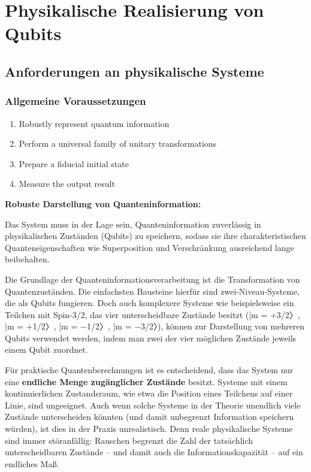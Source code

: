 \section{Physikalische Realisierung von Qubits }
\subsection{Anforderungen an physikalische Systeme }
\subsubsection{Allgemeine Voraussetzungen}

\begin{enumerate}
    \item Robustly represent quantum information
    \item Perform a universal family of unitary transformations
    \item Prepare a fiducial initial state
    \item Measure the output result
\end{enumerate}

    \item \textbf{Robuste Darstellung von Quanteninformation:}

 Das System muss in der Lage sein, Quanteninformation zuverlässig in physikalischen Zuständen (Qubits) zu speichern, sodass sie ihre charakteristischen Quanteneigenschaften wie Superposition und Verschränkung ausreichend lange beibehalten. 

Die Grundlage der Quanteninformationsverarbeitung ist die Transformation von Quantenzuständen. Die einfachsten Bausteine hierfür sind zwei-Niveau-Systeme, die als Qubits fungieren. Doch auch komplexere Systeme wie beispielsweise ein Teilchen mit Spin-3/2, das vier unterscheidbare Zustände besitzt (|m = +3/2〉, |m =
+1/2〉, |m = −1/2〉, |m = −3/2〉),  können zur Darstellung von mehreren Qubits verwendet werden, indem man zwei der vier möglichen Zustände jeweils einem Qubit zuordnet.

Für praktische Quantenberechnungen ist es entscheidend, dass das System nur eine \textbf{endliche Menge zugänglicher Zustände} besitzt. Systeme mit einem kontinuierlichen Zustandsraum, wie etwa die Position eines Teilchens auf einer Linie, sind ungeeignet. Auch wenn solche Systeme in der Theorie unendlich viele Zustände unterscheiden könnten (und damit unbegrenzt Information speichern würden), ist dies in der Praxis unrealistisch. Denn reale physikalische Systeme sind immer störanfällig: Rauschen begrenzt die Zahl der tatsächlich unterscheidbaren Zustände – und damit auch die Informationskapazität – auf ein endliches Maß.

